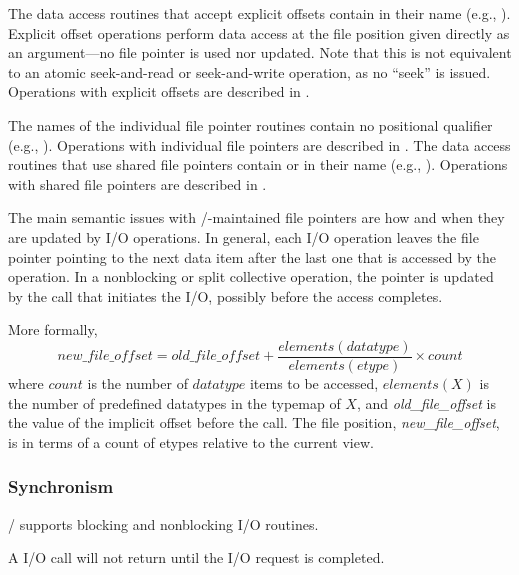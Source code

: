 The data access routines that accept explicit offsets
contain 
in their name (e.g., ).
Explicit offset operations perform data access at
the file position given directly as an argument---no
file pointer is used nor updated.
Note that this is not equivalent to an atomic seek-and-read
or seek-and-write operation,
as no ``seek'' is issued.
Operations with explicit offsets are described in
.

The names of the individual file pointer routines contain no
positional qualifier (e.g., ).
Operations with individual file pointers are described in
.
The data access routines that use shared file pointers contain
or  
in their name (e.g., ).
Operations with shared file pointers are described in
.

The main semantic issues with \MPI/-maintained file pointers
are how and when they are updated by I/O operations.
In general, each I/O operation leaves the file pointer pointing to the
next data item after the last one that
is accessed by the operation.
In a nonblocking or split collective operation,
the pointer is updated by the call that initiates the I/O,
possibly before the access completes.

More formally,
\[
    \textit{new\_file\_offset} = \textit{old\_file\_offset} + %
                \frac{elements(datatype)}{elements(etype)} \times count
\]
where $count$ is the number of $datatype$ items to be accessed,
$elements(X)$ is the number of predefined datatypes in the typemap of $X$,
and \textit{old\_file\_offset} is %
the value of the implicit offset before the call.
The file position, \textit{new\_file\_offset}, is in terms %
of a count of etypes relative to the current view.

\subsubsection{Synchronism}

\MPI/ supports blocking and nonblocking I/O routines.

A  I/O call will
not return
until the I/O request is completed.

